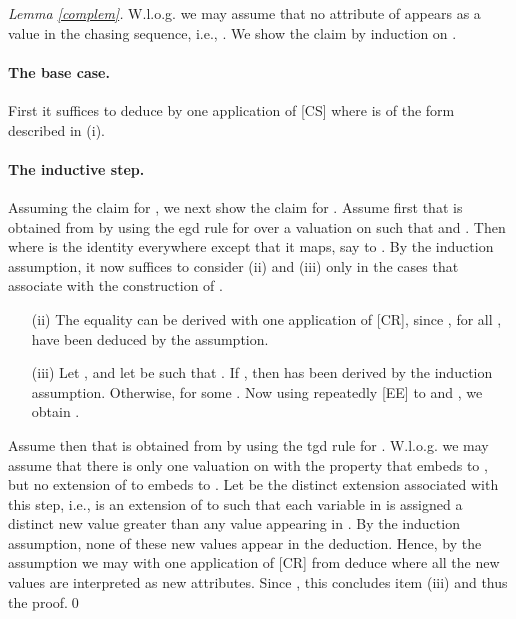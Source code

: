 \documentclass[envcountset]{llncs}
\begin{document}
\begin{proof}[Lemma \ref{complem}]
W.l.o.g. we may assume that no attribute of  appears as a value in the  chasing sequence, i.e., . We show the claim by induction on . 
\paragraph{\textbf{The base case.}} First it suffices to deduce by one application of [CS] 
 where  is of the form described in (i).

\paragraph{\textbf{The inductive step.}} Assuming the claim for , we next show the claim for .  Assume first that  is obtained from  by using the egd rule for    over a valuation  on   such that  and . Then  where  is the identity everywhere except that it maps, say  to . 
By the induction assumption, it now suffices to consider  (ii) and (iii) only in the cases that associate with the construction of . 
\begin{itemize}
\item[(ii)]   The  equality  can be derived with one application of [CR], since , for all , have been deduced by the assumption.
\item[(iii)] Let , and let  be such that . If , then  has been derived by the induction assumption. Otherwise,  for some . Now  using repeatedly [EE] to  and , we obtain .
\end{itemize}


Assume then that  is obtained from  by using the tgd rule for  .  W.l.o.g. we may assume that there is only one valuation   on  with the property that  embeds  to , but no extension of  to   embeds  to . Let  be the distinct extension associated with this step, i.e.,  is an extension of  to  such that each variable in  is assigned a distinct new value greater than any value appearing in . By the induction assumption, none of these new values appear in the deduction. Hence, by the assumption we may with one application of [CR] from  deduce  where all the new values are interpreted as new attributes. Since , this concludes item (iii) and thus the proof.\qed

\end{proof}
\end{document}
